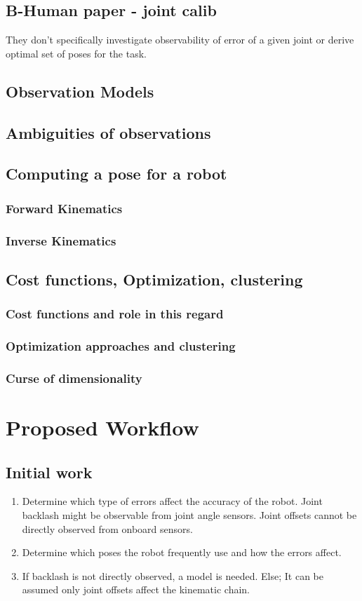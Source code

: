 \documentclass[english, printversion, nomenclature]{tuvisionthesis} %
\begin{document}
\section{B-Human paper - joint calib} %
They don't specifically investigate observability of error of a given joint or derive optimal set of poses for the task.

\section{Observation Models}
\section{Ambiguities of observations}
\section{Computing a pose for a robot}
\subsection{Forward Kinematics}
\subsection{Inverse Kinematics}

\section{Cost functions, Optimization, clustering}
\subsection{Cost functions and role in this regard}
\subsection{Optimization approaches and clustering}
\subsection{Curse of dimensionality}

\chapter{Proposed Workflow}

\section{Initial work}
\begin{enumerate}
	\item Determine which type of errors affect the accuracy of the robot.
	\subitem Joint backlash might be observable from joint angle sensors.
	\subitem Joint offsets cannot be directly observed from onboard sensors.
	\item Determine which poses the robot frequently use and how the errors affect.
	\item If backlash is not directly observed, a model is needed.
	\subitem Else; It can be assumed only joint offsets affect the kinematic chain.
\end{enumerate}
\end{document}
